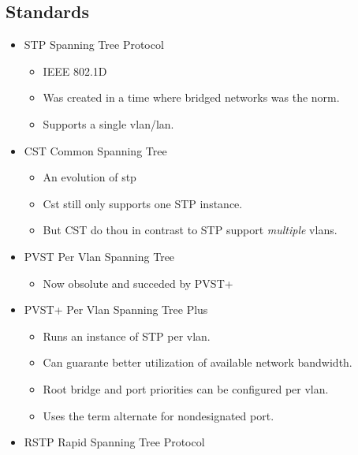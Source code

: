 
\subsection{Standards}

\begin{itemize}
    \item STP {\scriptsize Spanning Tree Protocol}
    \begin{itemize}
        \item IEEE 802.1D
        \item Was created in a time where bridged networks was the norm.
        \item Supports a single vlan/lan.
    \end{itemize}
    \item CST {\scriptsize Common Spanning Tree}
    \begin{itemize}
        \item An evolution of stp
        \item Cst still only supports one STP instance.
        \item But CST do thou in contrast to STP support \textit{multiple} vlans.
    \end{itemize}
    \item PVST {\scriptsize Per Vlan Spanning Tree}
    \begin{itemize}
        \item Now obsolute and succeded by PVST+
    \end{itemize}
    \item PVST+ {\scriptsize Per Vlan Spanning Tree Plus}
    \begin{itemize}
        \item Runs an instance of STP per vlan.
        \item Can guarante better utilization of available network bandwidth.
        \item Root bridge and port priorities can be configured per vlan.
        \item Uses the term alternate for nondesignated port.
    \end{itemize}
    \item RSTP {\scriptsize Rapid Spanning Tree Protocol}

\end{itemize}
